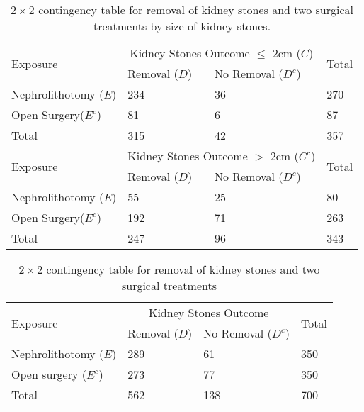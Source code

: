 \begin{customArrayStretch}{1.2}
\begin{table}[H]
    \centering
    \begin{tabular}{|l|l|l|l|}
        \hline
        \multirow{2}{*}{Exposure} & \multicolumn{2}{c|}{Kidney Stones Outcome $\leq$ 2cm ($C$)} & \multirow{2}{*}{Total}\\
        \cline{2-3}
        & Removal ($D$) & No Removal ($D^c$) & \\
        \hline
        Nephrolithotomy ($E$) & 234 & 36 & 270 \\ \hline
        Open Surgery($E^c$) & 81 & 6 & 87 \\ \hline
        Total & 315 & 42 & 357 \\ 

        \hline \hline

        \hline
        \multirow{2}{*}{Exposure} & \multicolumn{2}{c|}{Kidney Stones Outcome $>$ 2cm ($C^c$)} & \multirow{2}{*}{Total}\\
        \cline{2-3}
        & Removal ($D$) & No Removal ($D^c$) & \\
        \hline

        Nephrolithotomy ($E$) & 55 & 25 & 80 \\ \hline
        Open Surgery($E^c$) & 192 & 71 & 263 \\ \hline
        Total & 247 & 96 & 343 \\ \hline
    \end{tabular}
    \caption{
        $2 \times 2$ contingency table for removal of kidney stones and two surgical treatments by size of kidney stones.
        \cite{statistics/book/Statistics-for-Data-Scientists/Maurits-Kaptein}
    }
\end{table}

\begin{table}[H]
    \centering
    \begin{tabular}{|l|l|l|l|}
        \hline
        \multirow{2}{*}{Exposure} & \multicolumn{2}{c|}{Kidney Stones Outcome} & \multirow{2}{*}{Total}\\
        \cline{2-3}
        & Removal ($D$) & No Removal ($D^c$) & \\
        \hline

        Nephrolithotomy ($E$) & 289 & 61 & 350 \\ \hline
        Open surgery ($E^c$) & 273 & 77 & 350 \\ \hline
        Total & 562 & 138 & 700 \\ \hline
    \end{tabular}
    \caption{
        $2 \times 2$ contingency table for removal of kidney stones and two surgical treatments
        \cite{statistics/book/Statistics-for-Data-Scientists/Maurits-Kaptein}
    }
\end{table}
\end{customArrayStretch}



